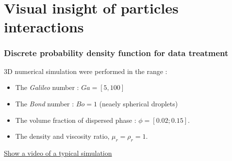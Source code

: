 \documentclass{sintefbeamer}
\begin{document}
\section{Visual insight of particles interactions}
\begin{frame}
\frametitle{Discrete probability density function for data treatment}


3D numerical simulation were performed in the range : 
\begin{itemize}
  \item The \textit{Galileo} number : $Ga = [5, 100]$
  \item The \textit{Bond} number : $Bo = 1$ (neaely spherical droplets)
  \item The volume fraction of dispersed phase : $\phi = [0.02;0.15]$. 
  \item The density and viscosity ratio, $\mu_r=\rho_r=1$. 
\end{itemize}

\underline{Show a video of a typical simulation}



\end{frame}
\end{document}
